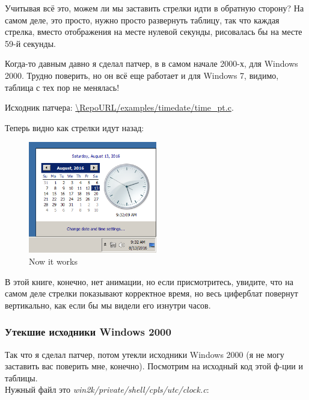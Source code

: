Учитывая всё это, можем ли мы заставить стрелки идти в обратную сторону?
На самом деле, это просто, нужно просто развернуть таблицу, так что каждая стрелка,
вместо отображения на месте нулевой секунды, рисовалась бы на месте 59-й секунды.

Когда-то давным давно я сделал патчер, в в самом начале 2000-х, для Windows 2000.
Трудно поверить, но он всё еще работает и для Windows 7, видимо, таблица с тех пор не менялась!

Исходник патчера: \url{\RepoURL/examples/timedate/time_pt.c}.

Теперь видно как стрелки идут назад:

\begin{figure}[H]
\centering
\includegraphics[width=0.5\textwidth]{examples/timedate/counterclockwise.png}
\caption{Now it works}
\end{figure}

В этой книге, конечно, нет анимации, но если присмотритесь, увидите, что на самом деле стрелки показывают корректное время,
но весь циферблат повернут вертикально, как если бы мы видели его изнутри часов.

\subsubsection{Утекшие исходники Windows 2000}

Так что я сделал патчер, потом утекли исходники Windows 2000 (я не могу заставить вас поверить мне, конечно).
Посмотрим на исходный код этой ф-ции и таблицы.\\
Нужный файл это \emph{win2k/private/shell/cpls/utc/clock.c}:

